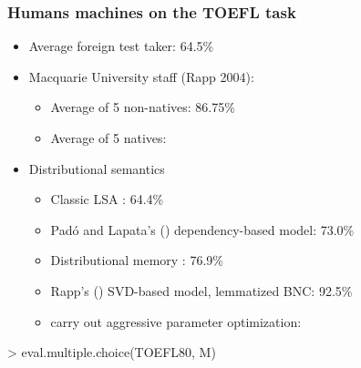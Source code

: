 \documentclass[t]{beamer} %
\begin{document}
\begin{frame}[fragile]
  \frametitle{Humans \vs machines on the TOEFL task}

  \ungap[1]
  \begin{itemize}
  \item Average foreign test taker: 64.5\%
  \item<2-> Macquarie University staff (Rapp 2004):
    \begin{itemize}
    \item Average of 5 non-natives: 86.75\%
    \item Average of 5 natives: 
    \end{itemize}
  \item<3-> Distributional semantics
    \begin{itemize}
    \item Classic LSA \citep{Landauer:Dumais:97}: 64.4\%
    \item Padó and Lapata's (\citeyear{Pado:Lapata:07}) dependency-based model: 73.0\%
    \item Distributional memory \citep{Baroni:Lenci:10}: 76.9\%
    \item Rapp's (\citeyear{Rapp:04a}) SVD-based model, lemmatized BNC: 92.5\%
    \item \citet{Bullinaria:Levy:12} carry out aggressive parameter optimization: 
    \end{itemize}
  \end{itemize}

\begin{Rcode}
> eval.multiple.choice(TOEFL80, M)
\end{Rcode}
\end{frame}
\end{document}
